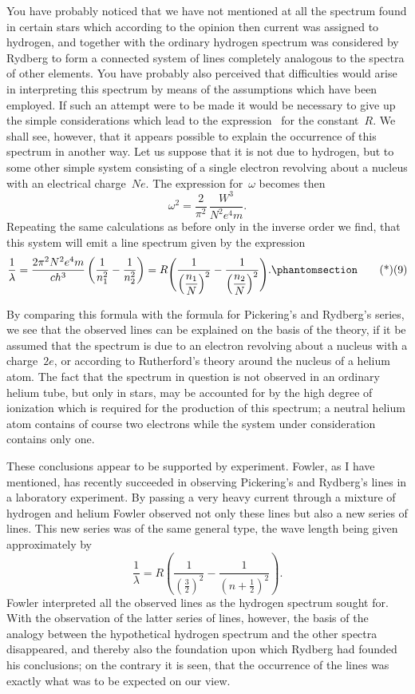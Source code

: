  You have probably noticed that we have
not mentioned at all the spectrum found in certain stars which
according to the opinion then current was assigned to hydrogen,
and together with the ordinary hydrogen spectrum was considered
by Rydberg to form a connected system of lines completely
analogous to the spectra of other elements. You have probably
also perceived that difficulties would arise in interpreting this
spectrum by means of the assumptions which have been employed.
If such an attempt were to be made it would be necessary to give
up the simple considerations which lead to the expression~ for
the constant~$R$. We shall see, however, that it appears possible to
explain the occurrence of this spectrum in another way. Let us
suppose that it is not due to hydrogen, but to some other simple
system consisting of a single electron revolving about a nucleus
with an electrical charge~$Ne$. The expression for~$\omega$ becomes then
\[
\omega^{2} = \frac{2}{\pi^{2}}\, \frac{W^{3}}{N^{2} e^{4} m}.
\]
Repeating the same calculations as before only in the inverse
order we find, that this system will emit a line spectrum given by
the expression
\[
\frac{1}{\lambda}
  = \frac{2\pi^{2} N^{2} e^{4} m}{ch^{3}}\left(\frac{1}{n_{1}^{2}} - \frac{1}{n_{2}^{2}}\right)
  = R\raisebox{-4pt}{$\Biggl($}\frac{1}{\left(\dfrac{n_{1}}{N}\right)^{2}} - \frac{1}{\left(\dfrac{n_{2}}{N}\right)^{2}}\raisebox{-4pt}{$\Biggr)$}.
\Tag{(9)}
\]

By comparing this formula with the formula for Pickering's and
Rydberg's series, we see that the observed lines can be explained
on the basis of the theory, if it be assumed that the spectrum is
due to an electron revolving about a nucleus with a charge~$2e$, or
according to Rutherford's theory around the nucleus of a helium
atom. The fact that the spectrum in question is not observed in
an ordinary helium tube, but only in stars, may be accounted for
by the high degree of ionization which is required for the production
of this spectrum; a neutral helium atom contains of course
two electrons while the system under consideration contains
only one.

These conclusions appear to be supported by experiment.
Fowler, as I have mentioned, has recently succeeded in observing
Pickering's and Rydberg's lines in a laboratory experiment. By
passing a very heavy current through a mixture of hydrogen and
helium Fowler observed not only these lines but also a new series
of lines. This new series was of the same general type, the wave
length being given approximately by
\[
\frac{1}{\lambda}
  = R\left(\frac{1}{(\frac{3}{2})^{2}} - \frac{1}{(n + \frac{1}{2})^{2}}\right).
\]
Fowler interpreted all the observed lines as the hydrogen spectrum
sought for. With the observation of the latter series of lines,
however, the basis of the analogy between the hypothetical
hydrogen spectrum and the other spectra disappeared, and thereby
also the foundation upon which Rydberg had founded his conclusions;
on the contrary it is seen, that the occurrence of the lines
was exactly what was to be expected on our view.

